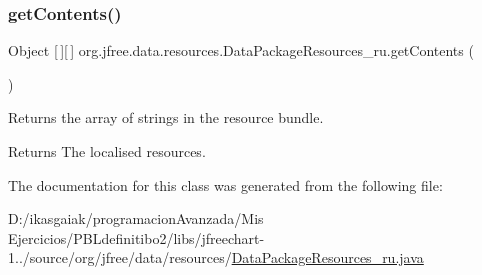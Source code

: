\subsubsection{\texorpdfstring{get\+Contents()}{getContents()}}
{\footnotesize\ttfamily Object \mbox{[}$\,$\mbox{]}\mbox{[}$\,$\mbox{]} org.\+jfree.\+data.\+resources.\+Data\+Package\+Resources\+\_\+ru.\+get\+Contents (\begin{DoxyParamCaption}{ }\end{DoxyParamCaption})}

Returns the array of strings in the resource bundle.

\begin{DoxyReturn}{Returns}
The localised resources. 
\end{DoxyReturn}


The documentation for this class was generated from the following file\+:\begin{DoxyCompactItemize}
\item 
D\+:/ikasgaiak/programacion\+Avanzada/\+Mis Ejercicios/\+P\+B\+Ldefinitibo2/libs/jfreechart-\/1../source/org/jfree/data/resources/\mbox{\hyperlink{_data_package_resources__ru_8java}{Data\+Package\+Resources\+\_\+ru.\+java}}\end{DoxyCompactItemize}
